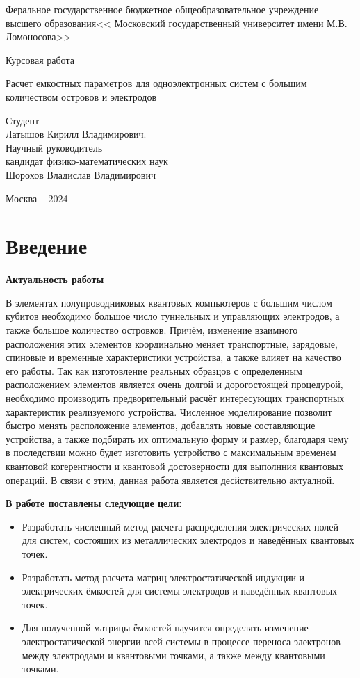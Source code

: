 \documentclass[a4paper,12pt]{report} %
\begin{document}
\begin{titlepage}
\begin{center}{\bfseries}
\large Феральное государственное бюджетное общеобразовательное учреждение высшего образования<< Московский государственный университет имени М.В. Ломоносова>>
\vfill
\centerline{{Курсовая работа}}
\vspace{1cm}
\large{Расчет емкостных параметров для одноэлектронных систем с большим количеством островов и электродов}
\vfill
\begin {flushright}
\large{Студент \\ Латышов Кирилл Владимирович. \\ Научный руководитель\\ кандидат физико-математических наук\\ Шорохов Владислав Владимирович}
\end{flushright}
\vfil
\centerline {Москва -- 2024}
\end{center}
\end{titlepage}
\tableofcontents %
\setcounter{page}{2}

\chapter*{Введение}
\textbf{\underline{Актуальность работы}}

В элементах полупроводниковых квантовых компьютеров с большим числом кубитов необходимо большое число туннельных и управляющих электродов, а также большое количество островков. Причём, изменение взаимного расположения этих элементов координально меняет транспортные, зарядовые, спиновые и временные характеристики устройства, а также влияет на качество его работы. Так как изготовление реальных образцов с определенным расположением элементов является очень долгой и дорогостоящей процедурой, необходимо производить предворительный расчёт интересующих транспортных характеристик реализуемого устройства. Численное моделирование позволит быстро менять расположение элементов, добавлять новые составляющие устройства, а также подбирать их оптимальную форму и размер, благодаря чему в последствии можно будет изготовить устройство с максимальным временем квантовой когерентности и квантовой достоверности для выполнния квантовых операций. В связи с этим, данная работа является десйствительно актуалной.  

\textbf{\underline{В работе поставлены следующие цели:}}
\begin{itemize}
  \item Разработать численный метод расчета распределения электрических полей для систем, состоящих из металлических электродов и наведённых квантовых точек.
  \item Разработать метод расчета матриц электростатической индукции и электрических ёмкостей для системы электродов и наведённых квантовых точек.
  \item Для полученной матрицы ёмкостей научится определять изменение электростатической энергии всей системы в процессе переноса электронов между электродами и квантовыми точками, а также между квантовыми точками.
\end{itemize}
\end{document}
